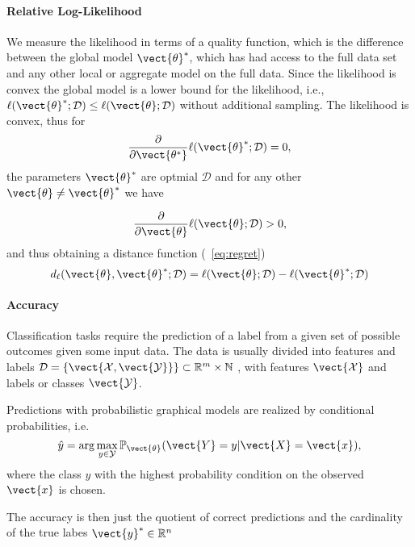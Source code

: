 \paragraph*{Relative Log-Likelihood}
We measure the likelihood in terms of a quality function, which is the difference between the global model $\vect{\theta}^*$, which has had access to the full data set and any other local or aggregate model on the full data. 
Since the likelihood is convex the global model is a lower bound for the likelihood, i.e., $\ell(\vect{\theta}^* ; \mathcal{D}) \leq   \ell(\vect{\theta} ; \mathcal{D})$ without additional sampling.
The likelihood is convex, thus for 
\begin{equation}
    \frac{\partial}{\partial \vect{\theta^*}} \ell(\vect{\theta}^* ; \mathcal{D})  = 0,
\end{equation}
the parameters $\vect{\theta}^*$ are optmial \wrt $\mathcal{D}$ and for any other $\vect{\theta} \neq \vect{\theta}^*$ we have 

\begin{equation}
    \frac{\partial}{\partial \vect{\theta}} \ell(\vect{\theta} ; \mathcal{D})  > 0,
\end{equation}
and thus obtaining a distance function (\eq~\ref{eq:regret})
\begin{equation}
d_{\ell}(\vect{\theta}, \vect{\theta}^*; \mathcal{D}) = \ell(\vect{\theta} ; \mathcal{D}) -    \ell(\vect{\theta}^* ; \mathcal{D})
\end{equation}

\paragraph*{Accuracy}
Classification tasks require the prediction of a label from a given set of possible outcomes given some input data. The data is usually divided into features and labels $\mathcal{D} = \{\vect{\mathcal{X}, \vect{\mathcal{Y}}}\} \subset \mathbb{R}^m \times \mathbb{N}$ , with features $\vect{\mathcal{X}}$ and labels or classes $\vect{\mathcal{Y}}$.

Predictions with probabilistic graphical models are realized by conditional probabilities, i.e.
\begin{equation}
    \hat{y} = \arg\max_{y \in \mathcal{Y}} \mathbb{P}_{\vect{\theta}}(\vect{Y} = y \lvert \vect{X} = \vect{x}) ,
\end{equation}
where the class $y$ with the highest probability condition on the observed $\vect{x}$ is chosen.

The accuracy is then just the quotient of correct predictions and the cardinality of the true labes $\vect{y}^* \in \mathbb{R}^n$

